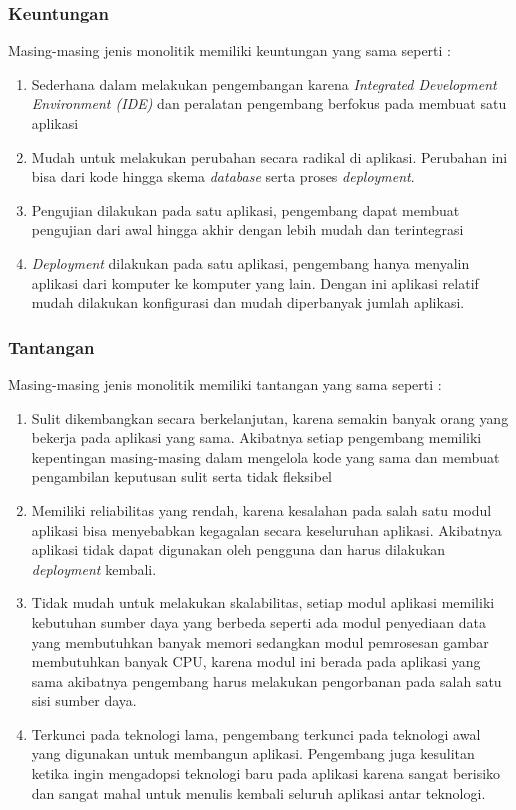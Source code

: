 \subsubsection{Keuntungan} 
Masing-masing jenis monolitik memiliki keuntungan yang sama seperti \cite{ECD,1C7}:
\begin{enumerate}[leftmargin=1.3cm]
\item Sederhana dalam melakukan pengembangan karena \textit{Integrated Development Environment (IDE)} dan peralatan pengembang berfokus pada membuat satu aplikasi
\item Mudah untuk melakukan perubahan secara radikal di aplikasi. Perubahan ini bisa dari kode hingga skema \textit{database} serta proses \textit{deployment}.
\item Pengujian dilakukan pada satu aplikasi, pengembang dapat membuat pengujian dari awal hingga akhir dengan lebih mudah dan terintegrasi
\item \textit{Deployment} dilakukan pada satu aplikasi, pengembang hanya menyalin aplikasi dari komputer ke komputer yang lain. Dengan ini aplikasi relatif mudah dilakukan konfigurasi dan mudah diperbanyak jumlah aplikasi.
\end{enumerate}

\subsubsection{Tantangan} 
Masing-masing jenis monolitik memiliki tantangan yang sama seperti \cite{ECD,1C7}:
\begin{enumerate}[leftmargin=1.3cm]
	\item Sulit dikembangkan secara berkelanjutan, karena semakin banyak orang yang bekerja pada aplikasi yang sama. Akibatnya setiap pengembang memiliki kepentingan masing-masing dalam mengelola kode yang sama dan membuat pengambilan keputusan sulit serta tidak fleksibel
	\item Memiliki reliabilitas yang rendah, karena kesalahan pada salah satu modul aplikasi bisa menyebabkan kegagalan secara keseluruhan aplikasi. Akibatnya aplikasi tidak dapat digunakan oleh pengguna dan harus dilakukan \textit{deployment} kembali.
	\item Tidak mudah untuk melakukan skalabilitas, setiap modul aplikasi memiliki kebutuhan sumber daya yang berbeda seperti ada modul penyediaan data yang membutuhkan banyak memori sedangkan modul pemrosesan gambar membutuhkan banyak CPU, karena modul ini berada pada aplikasi yang sama akibatnya pengembang harus melakukan pengorbanan pada salah satu sisi sumber daya.
	\item Terkunci pada teknologi lama, pengembang terkunci pada teknologi awal yang digunakan untuk membangun aplikasi. Pengembang juga kesulitan ketika ingin mengadopsi teknologi baru pada aplikasi karena sangat berisiko dan sangat mahal untuk menulis kembali seluruh aplikasi antar teknologi.\\
\end{enumerate}	

